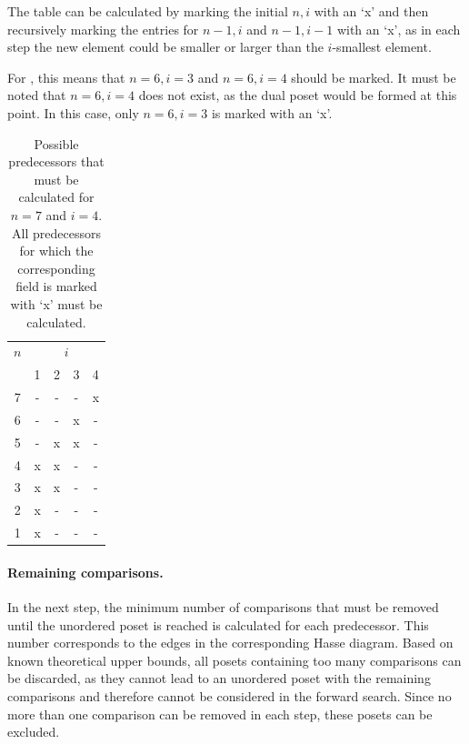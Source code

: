 \documentclass[twoside,leqno,twocolumn]{article}
\begin{document}
The table can be calculated by marking the initial $n, i$ with an `x' and then recursively marking the entries for $n - 1, i$ and $n - 1, i - 1$ with an `x', as in each step the new element could be smaller or larger than the $i$-smallest element.

For , this means that $n = 6, i = 3$ and $n = 6, i = 4$ should be marked.
It must be noted that $n = 6, i = 4$ does not exist, as the dual poset would be formed at this point.
In this case, only $n = 6, i = 3$ is marked with an `x'.

\begin{table}[!t]
  \renewcommand{\arraystretch}{1.1}
  \caption{Possible predecessors that must be calculated for $n = 7$ and $i = 4$.
    All predecessors for which the corresponding field is marked with `x' must be calculated.}
  \label{table:n_i_values_calculated}
  \centering
  \small
  \begin{tabular}{c|cccc}
    $n$ & \multicolumn{4}{c}{$i$}             \\
        & 1                       & 2 & 3 & 4 \\ \hline
    7   & -                       & - & - & x \\
    6   & -                       & - & x & - \\
    5   & -                       & x & x & - \\
    4   & x                       & x & - & - \\
    3   & x                       & x & - & - \\
    2   & x                       & - & - & - \\
    1   & x                       & - & - & - \\
  \end{tabular}%
\end{table}

\paragraph{Remaining comparisons.}
In the next step, the minimum number of comparisons that must be removed until the unordered poset is reached is calculated for each predecessor.
This number corresponds to the edges in the corresponding Hasse diagram.
Based on known theoretical upper bounds, all posets containing too many comparisons can be discarded, as they cannot lead to an unordered poset with the remaining comparisons and therefore cannot be considered in the forward search.
Since no more than one comparison can be removed in each step, these posets can be excluded.
\end{document}
